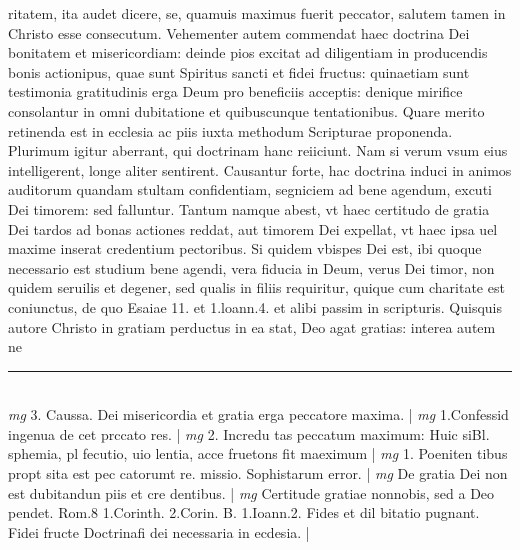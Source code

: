 \documentclass{article}
\begin{document}
\begin{pages}
ritatem, ita audet dicere, se, quamuis maximus fuerit peccator, salutem tamen in Christo esse consecutum. Vehementer autem commendat haec doctrina Dei bonitatem et misericordiam: deinde pios excitat ad diligentiam in producendis bonis actionipus, quae sunt Spiritus sancti et fidei fructus: quinaetiam sunt testimonia gratitudinis erga Deum pro beneficiis acceptis: denique  mirifice consolantur in omni dubitatione et quibuscunque tentationibus. Quare merito retinenda est in ecclesia ac piis iuxta methodum Scripturae proponenda. Plurimum igitur aberrant, qui doctrinam hanc reiiciunt. Nam si verum vsum eius intelligerent, longe aliter sentirent. Causantur forte, hac doctrina induci in animos auditorum quandam stultam confidentiam, segniciem ad bene agendum, excuti Dei timorem: sed falluntur. Tantum namque abest, vt haec certitudo de gratia Dei tardos ad bonas actiones reddat, aut timorem Dei expellat, vt haec ipsa uel maxime inserat credentium pectoribus. Si quidem vbispes Dei est, ibi quoque  necessario est studium bene agendi, vera fiducia in Deum, verus Dei timor, non quidem seruilis et degener, sed qualis in filiis requiritur, quique  cum charitate est coniunctus, de quo Esaiae 11. et 1.loann.4. et alibi passim in scripturis. Quisquis autore Christo in gratiam perductus in ea stat, Deo agat gratias: interea autem ne  \pend
\vspace{0.5cm}\noindent
\vspace{0.2cm}\rule{1cm}{0.2pt}\\ 
\hspace{0.2cm}\textit{mg}
\footnotesize 3. Caussa. Dei misericordia et gratia erga peccatore maxima. 
\normalsize| 
\hspace{0.2cm}\textit{mg}
\footnotesize 1.Confessid ingenua de cet prccato res. 
\normalsize| 
\hspace{0.2cm}\textit{mg}
\footnotesize 2. Incredu tas peccatum maximum: Huic siBl. sphemia, pl fecutio, uio lentia, acce fruetons fit maeximum 
\normalsize| 
\hspace{0.2cm}\textit{mg}
\footnotesize 1. Poeniten tibus propt sita est pec catorumt re. missio. Sophistarum error. 
\normalsize| 
\hspace{0.2cm}\textit{mg}
\footnotesize De gratia Dei non est dubitandun piis et cre dentibus. 
\normalsize| 
\hspace{0.2cm}\textit{mg}
\footnotesize Certitude gratiae nonnobis, sed a Deo pendet. Rom.8 1.Corinth. 2.Corin. B. 1.Ioann.2. Fides et dil bitatio pugnant. Fidei fructe Doctrinafi dei necessaria in ecdesia. 
\normalsize| 

\end{pages}
\end{document}
